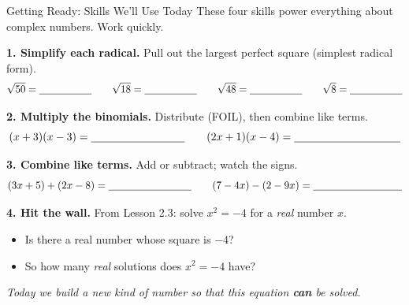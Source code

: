 \documentclass[10pt]{article}
\begin{document}

\vspace{0.10in}

\begin{notesbox}{Getting Ready: Skills We'll Use Today}
\small These four skills power everything about complex numbers. Work quickly.

\vspace{4pt}
\textbf{1. Simplify each radical.} Pull out the largest perfect square (simplest radical form).
\[
  \sqrt{50}=\blank{1.8cm} \qquad \sqrt{18}=\blank{1.8cm} \qquad
  \sqrt{48}=\blank{1.8cm} \qquad \sqrt{8}=\blank{1.8cm}
\]

\vspace{4pt}
\textbf{2. Multiply the binomials.} Distribute (FOIL), then combine like terms.
\[
  (x+3)(x-3)=\blank{3.0cm} \qquad (2x+1)(x-4)=\blank{3.4cm}
\]

\vspace{4pt}
\textbf{3. Combine like terms.} Add or subtract; watch the signs.
\[
  (3x+5)+(2x-8)=\blank{2.8cm} \qquad (7-4x)-(2-9x)=\blank{3.0cm}
\]

\vspace{4pt}
\textbf{4. Hit the wall.} From Lesson 2.3: solve $x^2=-4$ for a \emph{real} number $x$.
\begin{itemize}\setlength{\itemsep}{1pt}
  \item Is there a real number whose square is $-4$? \blank{2.0cm}
  \item So how many \emph{real} solutions does $x^2=-4$ have? \blank{2.0cm}
\end{itemize}
\emph{Today we build a new kind of number so that this equation \textbf{can} be solved.}
\end{notesbox}
\end{document}
